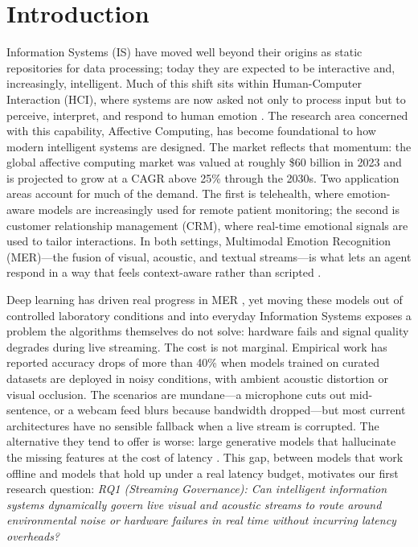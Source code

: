 \documentclass[sn-mathphys,Numbered]{sn-jnl}
\theoremstyle{thmstyleone}
\theoremstyle{thmstyletwo}
\theoremstyle{thmstylethree}
\begin{document}
\section{Introduction}\label{sec1}
Information Systems (IS) have moved well beyond their origins as static repositories for data processing; today they are expected to be interactive and, increasingly, intelligent. Much of this shift sits within Human-Computer Interaction (HCI), where systems are now asked not only to process input but to perceive, interpret, and respond to human emotion \cite{picard2003affective, zeng2008survey, poria2017review}. The research area concerned with this capability, Affective Computing, has become foundational to how modern intelligent systems are designed. The market reflects that momentum: the global affective computing market was valued at roughly \$60 billion in 2023 and is projected to grow at a CAGR above 25\% through the 2030s. Two application areas account for much of the demand. The first is telehealth, where emotion-aware models are increasingly used for remote patient monitoring; the second is customer relationship management (CRM), where real-time emotional signals are used to tailor interactions. In both settings, Multimodal Emotion Recognition (MER)---the fusion of visual, acoustic, and textual streams---is what lets an agent respond in a way that feels context-aware rather than scripted \cite{poria2019emotion}.

Deep learning has driven real progress in MER \cite{gu2023comprehensive}, yet moving these models out of controlled laboratory conditions and into everyday Information Systems exposes a problem the algorithms themselves do not solve: hardware fails and signal quality degrades during live streaming. The cost is not marginal. Empirical work has reported accuracy drops of more than 40\% when models trained on curated datasets are deployed in noisy conditions, with ambient acoustic distortion or visual occlusion. The scenarios are mundane---a microphone cuts out mid-sentence, or a webcam feed blurs because bandwidth dropped---but most current architectures have no sensible fallback when a live stream is corrupted. The alternative they tend to offer is worse: large generative models that hallucinate the missing features at the cost of latency \cite{zhao2023missing}. This gap, between models that work offline and models that hold up under a real latency budget, motivates our first research question: \textit{RQ1 (Streaming Governance): Can intelligent information systems dynamically govern live visual and acoustic streams to route around environmental noise or hardware failures in real time without incurring latency overheads?}
\end{document}
